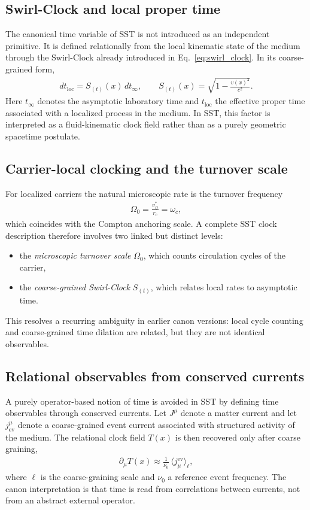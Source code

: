 \documentclass[11pt]{article}
\theoremstyle{definition}
\theoremstyle{plain}
\theoremstyle{remark}
\newcommand{\rc}{{r_c}}
\newcommand{\vchar}{v_{\!\boldsymbol{\circlearrowleft}}^{\ast}}
\begin{document}
    \subsection{Swirl-Clock and local proper time}
        The canonical time variable of SST is not introduced as an independent primitive. It is defined relationally from the local kinematic state of the medium through the Swirl-Clock already introduced in Eq.~\eqref{eq:swirl_clock}. In its coarse-grained form,
        \begin{align}
            dt_{\mathrm{loc}} = S_{(t)}(x)\,dt_{\infty},
            \qquad
            S_{(t)}(x)=\sqrt{1-\frac{v(x)^2}{c^2}}.
        \end{align}
        Here $t_{\infty}$ denotes the asymptotic laboratory time and $t_{\mathrm{loc}}$ the effective proper time associated with a localized process in the medium. In SST, this factor is interpreted as a fluid-kinematic clock field rather than as a purely geometric spacetime postulate.

    \subsection{Carrier-local clocking and the turnover scale}
        For localized carriers the natural microscopic rate is the turnover frequency
        \begin{align}
            \Omega_0 = \frac{\vchar}{\rc} = \omega_c,
        \end{align}
        which coincides with the Compton anchoring scale. A complete SST clock description therefore involves two linked but distinct levels:
        \begin{itemize}
            \item the \emph{microscopic turnover scale} $\Omega_0$, which counts circulation cycles of the carrier,
            \item the \emph{coarse-grained Swirl-Clock} $S_{(t)}$, which relates local rates to asymptotic time.
        \end{itemize}
        This resolves a recurring ambiguity in earlier canon versions: local cycle counting and coarse-grained time dilation are related, but they are not identical observables.

    \subsection{Relational observables from conserved currents}
        A purely operator-based notion of time is avoided in SST by defining time observables through conserved currents. Let $J^\mu$ denote a matter current and let $j_{\mathrm{ev}}^\mu$ denote a coarse-grained event current associated with structured activity of the medium. The relational clock field $T(x)$ is then recovered only after coarse graining,
        \begin{align}
            \partial_\mu T(x) \approx \frac{1}{\nu_0}\,\langle j^{\mathrm{ev}}_\mu \rangle_{\ell},
        \end{align}
        where $\ell$ is the coarse-graining scale and $\nu_0$ a reference event frequency. The canon interpretation is that time is read from correlations between currents, not from an abstract external operator.
\end{document}
